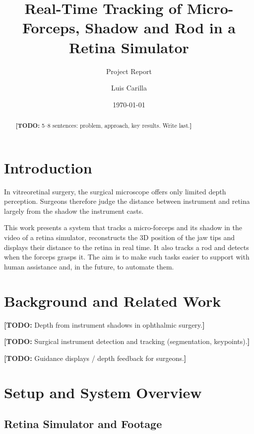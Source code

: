 \documentclass[english]{tum-article}
\title{Real-Time Tracking of Micro-Forceps, Shadow and Rod in a Retina Simulator}
\subtitle{Project Report}
\author{Luis Carilla}
\affil{\todo{Chair / Department}, Technical University of Munich}
\date{\today}
\newcommand{\todo}[1]{\textcolor{TUMOrange}{\textbf{[TODO:} #1\textbf{]}}}
\begin{document}
\maketitle

\begin{abstract}
  \todo{5--8 sentences: problem, approach, key results. Write last.}
\end{abstract}

\section{Introduction}
\label{sec:intro}

In vitreoretinal surgery, the surgical microscope offers only limited depth
perception. Surgeons therefore judge the distance between instrument and retina
largely from the shadow the instrument casts.

This work presents a system that tracks a micro-forceps and its shadow in the
video of a retina simulator, reconstructs the 3D position of the jaw tips and
displays their distance to the retina in real time. It also tracks a rod and
detects when the forceps grasps it. The aim is to make such tasks easier to
support with human assistance and, in the future, to automate them.

\section{Background and Related Work}
\label{sec:related}

\todo{Depth from instrument shadows in ophthalmic surgery.}

\todo{Surgical instrument detection and tracking (segmentation, keypoints).}

\todo{Guidance displays / depth feedback for surgeons.}

\section{Setup and System Overview}
\label{sec:system}

\subsection{Retina Simulator and Footage}
\label{sec:system-sim}
\end{document}
